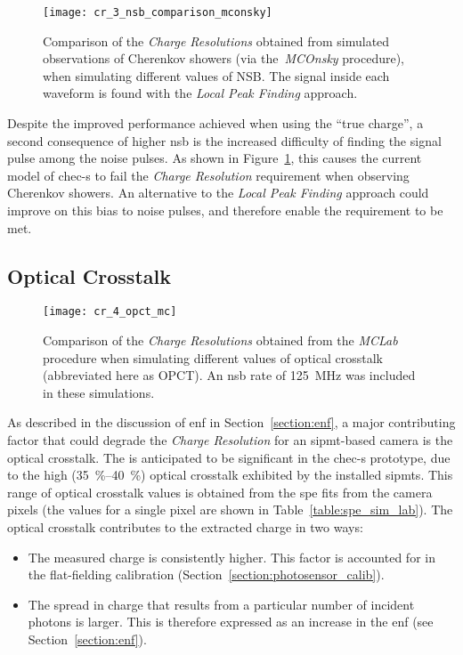 \begin{figure}
	\centering
    \texttt{[image: cr\_3\_nsb\_comparison\_mconsky]} 
	\caption[Comparison of the \textit{Charge Resolution} at two different NSBs when observing Cherenkov showers (via the\textit{MCOnsky} procedure).]{Comparison of the \textit{Charge Resolutions} obtained from simulated observations of Cherenkov showers (via the~\textit{MCOnsky} procedure), when simulating different values of NSB. The signal inside each waveform is found with the \textit{Local Peak Finding} approach.}
	\label{fig:cr_3_nsb_comparison_mconsky}
\end{figure}

Despite the improved performance achieved when using the ``true charge'', a second consequence of higher \gls{nsb} is the increased difficulty of finding the signal pulse among the noise pulses. As shown in Figure~\ref{fig:cr_3_nsb_comparison_mconsky}, this causes the current model of \gls{chec-s} to fail the \textit{Charge Resolution} requirement when observing Cherenkov showers. An alternative to the \textit{Local Peak Finding} approach could improve on this bias to noise pulses, and therefore enable the requirement to be met.

\subsection{Optical Crosstalk}

\begin{figure}[H]
	\centering
    \texttt{[image: cr\_4\_opct\_mc]} 
	\caption[Comparison of the \textit{Charge Resolution} at different values of optical crosstalk.]{Comparison of the \textit{Charge Resolutions} obtained from the \textit{MCLab} procedure when simulating different values of optical crosstalk (abbreviated here as OPCT). An \gls{nsb} rate of \SI{125}{MHz} was included in these simulations.}
	\label{fig:cr_4_opct_mc}
\end{figure}

As described in the discussion of \gls{enf} in Section~\ref{section:enf}, a major contributing factor that could degrade the \textit{Charge Resolution} for an  \gls{sipmt}-based camera is the optical crosstalk. The is anticipated to be significant in the \gls{chec-s} prototype, due to the high (\SIrange{35}{40}{\percent}) optical crosstalk exhibited by the installed \glspl{sipmt}. This range of optical crosstalk values is obtained from the \gls{spe} fits from the camera pixels (the values for a single pixel are shown in Table~\ref{table:spe_sim_lab}). The optical crosstalk contributes to the extracted charge in two ways: 
\begin{itemize}
\item The measured charge is consistently higher. This factor is accounted for in the flat-fielding calibration (Section~\ref{section:photosensor_calib}).
\item The spread in charge that results from a particular number of incident photons is larger. This is therefore expressed as an increase in the \gls{enf} (see Section~\ref{section:enf}).
\end{itemize}

